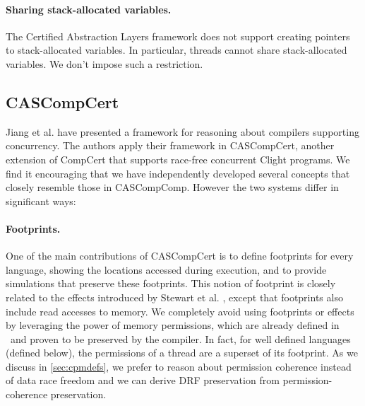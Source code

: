 \paragraph{Sharing stack-allocated variables.} The Certified Abstraction Layers framework does not support creating pointers to stack-allocated variables. In particular, threads cannot share stack-allocated variables. We don't impose such a restriction.

\subsection*{CASCompCert}

Jiang et al. \cite{jiang14:pldi} have presented a framework for reasoning about compilers supporting concurrency. The authors apply their framework in CASCompCert, another extension of CompCert that supports race-free concurrent Clight programs. We find it encouraging that we have independently developed several concepts that closely resemble those in CASCompComp. However the two systems differ in significant ways:

\paragraph{Footprints.} One of the main contributions of CASCompCert is to define footprints for every language, showing the locations accessed during execution, and to provide simulations that preserve these footprints. This notion of footprint is closely related to the effects introduced by Stewart et al. \cite{compcomp}, except that footprints also include read accesses to memory. We completely avoid using footprints or effects by leveraging the power of memory permissions, which are already defined in \compcert\ and proven to be preserved by the compiler. In fact, for well defined languages (defined below), the permissions of a thread are a superset of its footprint. As we discuss in \autoref{sec:cpmdefs}, we prefer to reason about permission coherence instead of data race freedom and we can derive DRF preservation from permission-coherence preservation. 


